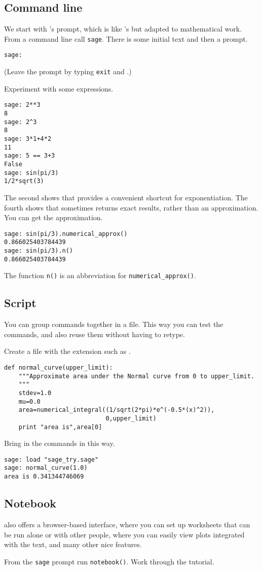 \subsection{Command line}
We start with \Sage's prompt, which is like \python's but adapted to 
mathematical work.
From a command line call \lstinline[style=inline]!sage!.
There is some initial text and then a prompt.
\begin{lstlisting}[style=python]
sage:  
\end{lstlisting}
(Leave the prompt by typing \lstinline[style=inline]!exit!
and .)

Experiment with some expressions.
\begin{lstlisting}[style=python]
sage: 2**3                                                                           
8
sage: 2^3
8
sage: 3*1+4*2
11
sage: 5 == 3+3
False
sage: sin(pi/3)
1/2*sqrt(3)
\end{lstlisting}
The second shows that \Sage{} provides a convenient shortcut for exponentiation.
The fourth shows that \Sage{} sometimes returns exact results, rather than an
approximation.
You can get the approximation. 
\begin{lstlisting}[style=python]
sage: sin(pi/3).numerical_approx()
0.866025403784439
sage: sin(pi/3).n()
0.866025403784439  
\end{lstlisting}
The function \lstinline[style=inline]!n()! is an abbreviation for 
\lstinline[style=inline]!numerical_approx()!.


\subsection{Script}
You can group \Sage{} commands together in a file.
This way you can test the commands, 
and also reuse them without having to retype.

Create a file with the extension  such as .
\begin{lstlisting}[style=python]
def normal_curve(upper_limit):
    """Approximate area under the Normal curve from 0 to upper_limit.
    """
    stdev=1.0
    mu=0.0
    area=numerical_integral((1/sqrt(2*pi)*e^(-0.5*(x)^2)),
                            0,upper_limit)    
    print "area is",area[0]
\end{lstlisting}
Bring in the commands in this way.
\begin{lstlisting}[style=python]
sage: load "sage_try.sage"
sage: normal_curve(1.0)   
area is 0.341344746069  
\end{lstlisting}


\subsection{Notebook}
\Sage{} also offers a browser-based interface, where you can set up
worksheets that can be run alone or with other people, where you can easily
view plots integrated with the text, and many other nice features.

From the \lstinline[style=inline]!sage! prompt run \lstinline[style=inline]!notebook()!.
Work through the tutorial.
\endinput


TODO:
  1) save Sage session?
  2) exercises?